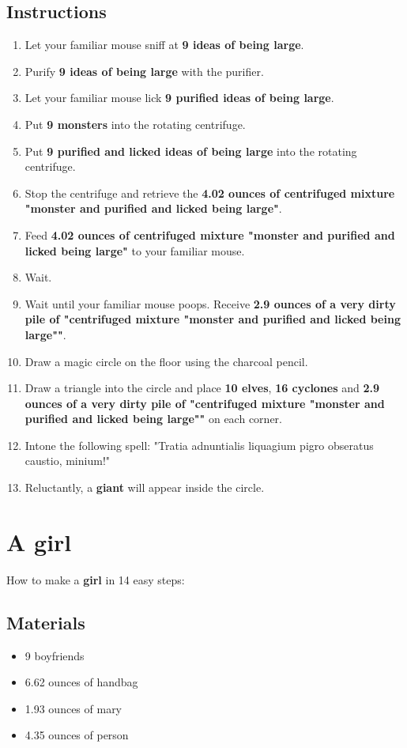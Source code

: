 \documentclass{article}
\begin{document}
\subsection{Instructions}\begin{enumerate}
\item 
Let your familiar mouse sniff at \textbf{9 ideas of being large}.
\item 
Purify \textbf{9 ideas of being large} with the purifier.
\item 
Let your familiar mouse lick \textbf{9 purified ideas of being large}.
\item 
Put \textbf{9 monsters} into the rotating centrifuge.
\item 
Put \textbf{9 purified and licked ideas of being large} into the rotating centrifuge.
\item 
Stop the centrifuge and retrieve the \textbf{4.02 ounces of centrifuged mixture "monster and purified and licked being large"}.
\item 
Feed \textbf{4.02 ounces of centrifuged mixture "monster and purified and licked being large"} to your familiar mouse.
\item 
Wait.
\item 
Wait until your familiar mouse poops. Receive \textbf{2.9 ounces of a very dirty pile of "centrifuged mixture "monster and purified and licked being large""}.
\item 
Draw a magic circle on the floor using the charcoal pencil.
\item 
Draw a triangle into the circle and place \textbf{10 elves}, \textbf{16 cyclones} and \textbf{2.9 ounces of a very dirty pile of "centrifuged mixture "monster and purified and licked being large""} on each corner.
\item 
Intone the following spell: "Tratia adnuntialis liquagium pigro obseratus caustio, minium!"
\item 
Reluctantly, a \textbf{giant} will appear inside the circle.
\end{enumerate}
\newpage
\section{A girl}How to make a \textbf{girl} in 14 easy steps:

\subsection{Materials}\begin{itemize}
\item 
9 boyfriends
\item 
6.62 ounces of handbag
\item 
1.93 ounces of mary
\item 
4.35 ounces of person
\end{itemize}
\end{document}
